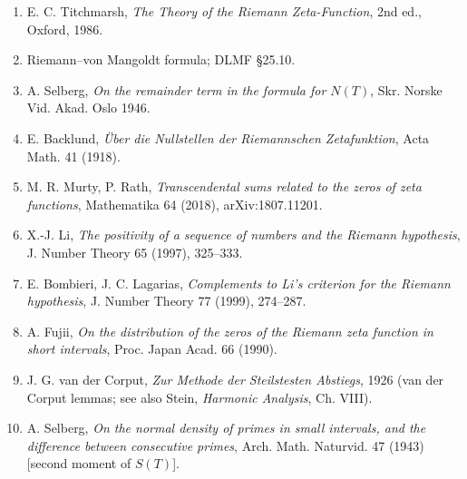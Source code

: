 \documentclass[
]{article}
\providecommand{\tightlist}{%
  \setlength{\itemsep}{0pt}\setlength{\parskip}{0pt}}
\begin{document}
\begin{enumerate}
\def\labelenumi{\arabic{enumi}.}
\tightlist
\item
  E. C. Titchmarsh, \emph{The Theory of the Riemann Zeta-Function}, 2nd
  ed., Oxford, 1986.
\item
  Riemann--von Mangoldt formula; DLMF §25.10.
\item
  A. Selberg, \emph{On the remainder term in the formula for \(N(T)\)},
  Skr. Norske Vid. Akad. Oslo 1946.
\item
  E. Backlund, \emph{Über die Nullstellen der Riemannschen
  Zetafunktion}, Acta Math. 41 (1918).
\item
  M. R. Murty, P. Rath, \emph{Transcendental sums related to the zeros
  of zeta functions}, Mathematika 64 (2018), arXiv:1807.11201.
\item
  X.-J. Li, \emph{The positivity of a sequence of numbers and the
  Riemann hypothesis}, J. Number Theory 65 (1997), 325--333.
\item
  E. Bombieri, J. C. Lagarias, \emph{Complements to Li's criterion for
  the Riemann hypothesis}, J. Number Theory 77 (1999), 274--287.
\item
  A. Fujii, \emph{On the distribution of the zeros of the Riemann zeta
  function in short intervals}, Proc. Japan Acad. 66 (1990).
\item
  J. G. van der Corput, \emph{Zur Methode der Steilstesten Abstiegs},
  1926 (van der Corput lemmas; see also Stein, \emph{Harmonic Analysis},
  Ch. VIII).
\item
  A. Selberg, \emph{On the normal density of primes in small intervals,
  and the difference between consecutive primes}, Arch. Math. Naturvid.
  47 (1943) {[}second moment of \(S(T)\){]}.
\end{enumerate}
\end{document}
